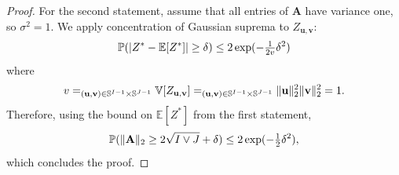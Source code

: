 \documentclass[twoside]{article}
\newcommand{\vu}{\mathbf{u}}
\newcommand{\vv}{\mathbf{v}}
\newcommand{\mA}{\mathbf{A}}
\newcommand{\E}{\mathbb{E}}
\newcommand{\R}{\mathbb{R}}
\newcommand{\V}{\mathbb{V}}
\newcommand{\opspace}{}
\let\sup\relax\DeclareMathOperator*{\sup}{sup\opspace}
\DeclarePairedDelimiter\norm{\|}{\|}             %
\DeclarePairedDelimiter\abs{|}{|}                %
\theoremstyle{theoremstyle}
\newtheorem{lemma}[theorem]{Lemma}
\begin{document}
\begin{proof}
    For the second statement, assume that all entries of $\mA$ have variance one, so $\sigma^2=1$.
    We apply concentration of Gaussian suprema \citep[e.g., Exercise 5.10 by][]{Wainwright:2019:High-Dimensional_Statistics_A_Non-Asymptotic_Viewpoint} to $Z_{\vu,\vv}$:
    \begin{equation}
        \mathbb{P}(
            \abs{
                Z^* - \E[Z^*]
            } \ge \delta
        ) \le 2 \exp(-\tfrac1{2 v} \delta^2)
    \end{equation}
    where
    \begin{equation}
        v = \sup_{(\vu, \vv) \in \mathbb{S}^{I - 1} \times \mathbb{S}^{J - 1}} \V[Z_{\vu,\vv}] = \sup_{(\vu, \vv) \in \mathbb{S}^{I - 1} \times \mathbb{S}^{J - 1}}\norm{\vu}_2^2 \norm{\vv}_2^2 = 1.
    \end{equation}
    Therefore, using the bound on $\E[Z^*]$ from the first statement,
    \begin{equation}
        \mathbb{P}(\norm{\mA}_2 \ge 2 \sqrt{I \lor J} + \delta) \le 2 \exp(-\tfrac1{2} \delta^2),
    \end{equation}
    which concludes the proof.
\end{proof}

\end{document}
